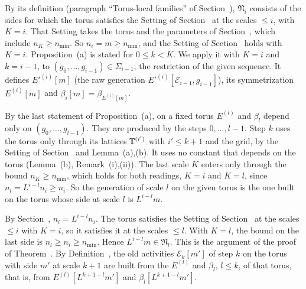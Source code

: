 \begin{step}[$\mathfrak N_i$ gives the Setting of Section~\Nref{sec:flow4} with $K=i$]
By its definition (paragraph ``Torus-local families'' of Section~), $\mathfrak N_i$ consists of the sides for which the torus satisfies the Setting of Section~ at the scales $\le i$, with $K=i$. That Setting takes the torus and the parameters of Section~, which include $n_K\ge n_{\min}$. So $n_i=m\ge n_{\min}$, and the Setting of Section~ holds with $K=i$. Proposition~(a) is stated for $0\le k<K$. We apply it with $K=i$ and $k=i-1$, to $(g_0,\dots,g_{i-1})\in\Sigma_{i-1}$, the restriction of the given sequence. It defines $E'^{(i)}[m]$ (the raw generation $E'^{(i)}[\mathcal E_{i-1},g_{i-1}]$), its symmetrization $E^{(i)}[m]$ and $\beta_i[m]=\beta_{E^{(i)}[m]}$.
\end{step}

\begin{step}[Dependence]
By the last statement of Proposition~(a), on a fixed torus $E^{(l)}$ and $\beta_l$ depend only on $(g_0,\dots,g_{l-1})$. They are produced by the steps $0,\dots,l-1$. Step $k$ uses the torus only through its lattices $\mathbb T^{(i')}$ with $i'\le k+1$ and the grid, by the Setting of Section~ and Lemma~(a),(b). It uses no constant that depends on the torus (Lemma~(b), Remark~(i),(ii)). The last scale $K$ enters only through the bound $n_K\ge n_{\min}$, which holds for both readings, $K=i$ and $K=l$, since $n_l=L^{i-l}n_i\ge n_i$. So the generation of scale $l$ on the given torus is the one built on the torus whose side at scale $l$ is $L^{i-l}m$.
\end{step}

\begin{step}[Sides]
By Section~, $n_l=L^{i-l}n_i$. The torus satisfies the Setting of Section~ at the scales $\le i$ with $K=i$, so it satisfies it at the scales $\le l$. With $K=l$, the bound on the last side is $n_l\ge n_i\ge n_{\min}$. Hence $L^{i-l}m\in\mathfrak N_l$. This is the argument of the proof of Theorem~. By Definition~, the old activities $\mathcal E_k[m']$ of step $k$ on the torus with side $m'$ at scale $k+1$ are built from the $E^{(l)}$ and $\beta_l$, $l\le k$, of that torus, that is, from $E^{(l)}[L^{k+1-l}m']$ and $\beta_l[L^{k+1-l}m']$.
\end{step}

